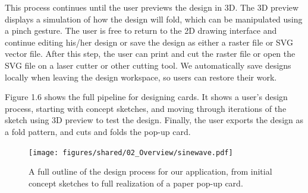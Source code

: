 This process continues until the user previews the design in 3D. The 3D
preview displays a simulation of how the design will fold, which can be
manipulated using a pinch gesture. The user is free to return to the 2D
drawing interface and continue editing his/her design or save the design
as either a raster file or SVG vector file. After this step, the user
can print and cut the raster file or open the SVG file on a laser cutter
or other cutting tool. We automatically save designs locally when
leaving the design workspace, so users can restore their work.

Figure 1.6 shows the full pipeline for designing cards. It shows a
user's design process, starting with concept sketches, and moving
through iterations of the sketch using 3D preview to test the design.
Finally, the user exports the design as a fold pattern, and cuts and
folds the pop-up card.

\begin{figure}[htbp]
\centering
\texttt{[image: figures/shared/02\_Overview/sinewave.pdf]}
\caption{A full outline of the design process for our application, from
initial concept sketches to full realization of a paper pop-up card.}
\end{figure}
